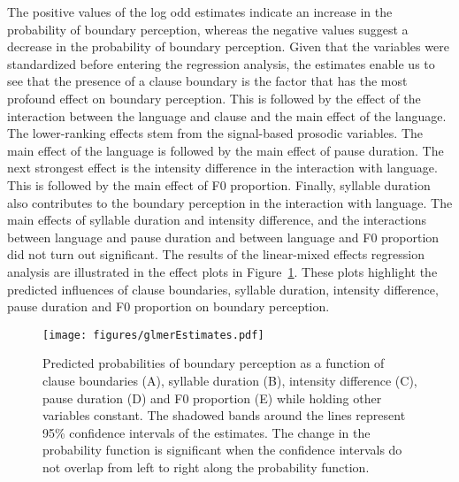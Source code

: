 \documentclass[output=paper]{langscibook}
\begin{document}
    The positive values of the log odd estimates indicate an increase in the probability of boundary perception, whereas the negative values suggest a decrease in the probability of boundary perception. Given that the variables were standardized before entering the regression analysis, the estimates enable us to see that the presence of a clause boundary is the factor that has the most profound effect on boundary perception. This is followed by the effect of the interaction between the language and clause and the main effect of the language. The lower-ranking effects stem from the signal-based prosodic variables. The main effect of the language is followed by the main effect of pause duration. The next strongest effect is the intensity difference in the interaction with language. This is followed by the main effect of F0 proportion. Finally, syllable duration also contributes to the boundary perception in the interaction with language. The main effects of syllable duration and intensity difference, and the interactions between language and pause duration and between language and F0 proportion did not turn out significant. The results of the linear-mixed effects regression analysis are illustrated in the effect plots in Figure~\ref{fig:1:estimates}. These plots highlight the predicted influences of clause boundaries, syllable duration, intensity difference, pause duration and F0 proportion on boundary perception.

    \begin{figure}%
		\centering\texttt{[image: figures/glmerEstimates.pdf]}\\
	    \caption{Predicted probabilities of boundary perception as a function of clause boundaries (A), syllable duration (B), intensity difference (C), pause duration (D) and F0 proportion (E) while holding other variables constant. The shadowed bands around the lines represent 95\% confidence intervals of the estimates. The change in the probability function is significant when the confidence intervals do not overlap from left to right along the probability function.}
	    \label{fig:1:estimates}
    \end{figure}
    
\end{document}
